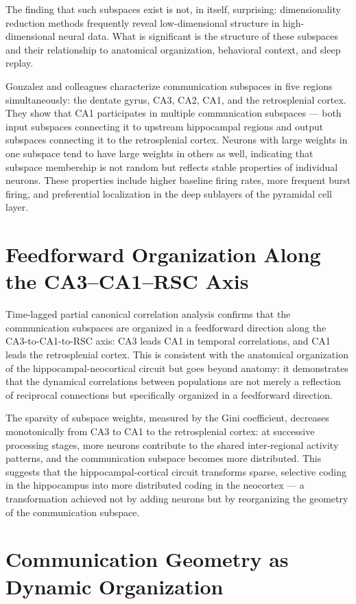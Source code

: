 \documentclass[12pt, a4paper, openany]{book}
\theoremstyle{definition}
\theoremstyle{remark}
\begin{document}
The finding that such subspaces exist is not, in itself, surprising: dimensionality reduction methods frequently reveal low-dimensional structure in high-dimensional neural data. What is significant is the structure of these subspaces and their relationship to anatomical organization, behavioral context, and sleep replay.

Gonzalez and colleagues characterize communication subspaces in five regions simultaneously: the dentate gyrus, CA3, CA2, CA1, and the retrosplenial cortex. They show that CA1 participates in multiple communication subspaces — both input subspaces connecting it to upstream hippocampal regions and output subspaces connecting it to the retrosplenial cortex. Neurons with large weights in one subspace tend to have large weights in others as well, indicating that subspace membership is not random but reflects stable properties of individual neurons. These properties include higher baseline firing rates, more frequent burst firing, and preferential localization in the deep sublayers of the pyramidal cell layer.

\section{Feedforward Organization Along the CA3--CA1--RSC Axis}

Time-lagged partial canonical correlation analysis confirms that the communication subspaces are organized in a feedforward direction along the CA3-to-CA1-to-RSC axis: CA3 leads CA1 in temporal correlations, and CA1 leads the retrosplenial cortex. This is consistent with the anatomical organization of the hippocampal-neocortical circuit but goes beyond anatomy: it demonstrates that the dynamical correlations between populations are not merely a reflection of reciprocal connections but specifically organized in a feedforward direction.

The sparsity of subspace weights, measured by the Gini coefficient, decreases monotonically from CA3 to CA1 to the retrosplenial cortex: at successive processing stages, more neurons contribute to the shared inter-regional activity patterns, and the communication subspace becomes more distributed. This suggests that the hippocampal-cortical circuit transforms sparse, selective coding in the hippocampus into more distributed coding in the neocortex — a transformation achieved not by adding neurons but by reorganizing the geometry of the communication subspace.

\section{Communication Geometry as Dynamic Organization}
\end{document}
